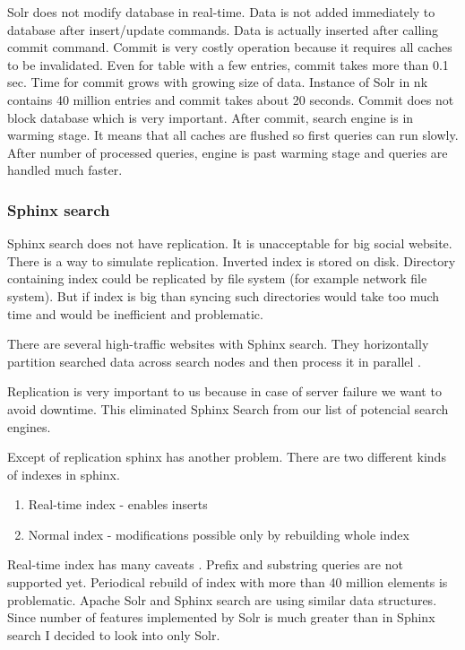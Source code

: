 \documentclass[10pt,a4paper]{article}
\begin{document}
Solr does not modify database in real-time. Data is not added immediately to database after insert/update commands. Data is actually inserted after calling commit command. Commit is very costly operation because it requires all caches to be invalidated. Even for table with a few entries, commit takes more than 0.1 sec. Time for commit grows with growing size of data. Instance of Solr in nk contains 40 million entries and commit takes about 20 seconds. Commit does not block database which is very important. After commit, search engine is in warming stage. It means that all caches are flushed so first queries can run slowly. After number of processed queries, engine is past warming stage and queries are handled much faster.

\subsubsection{Sphinx search}

Sphinx search does not have replication. It is unacceptable for big social website. There is a way to simulate replication. Inverted index is stored on disk. Directory containing index could be replicated by file system (for example network file system). But if index is big than syncing such directories would take too much time and would be inefficient and problematic.

There are several high-traffic websites with Sphinx search. They horizontally partition searched data across search nodes and then process it in parallel \cite{SPHINXPARAL}.

Replication is very important to us because in case of server failure we want to avoid downtime. This eliminated Sphinx Search from our list of potencial search engines. 

Except of replication sphinx has another problem. There are two different kinds of indexes in sphinx.
\begin{enumerate}
\item Real-time index - enables inserts
\item Normal index - modifications possible only by rebuilding whole index
\end{enumerate}

Real-time index has many caveats \cite{SPHINXCAV}. Prefix and substring queries are not supported yet. Periodical rebuild of index with more than 40 million elements is problematic. Apache Solr and Sphinx search are using similar data structures. Since number of features implemented by Solr is much greater than in Sphinx search I decided to look into only Solr. 
\end{document}
